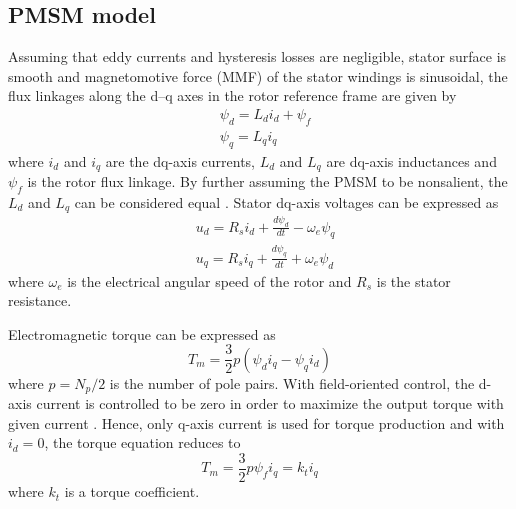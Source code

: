 \subsection{PMSM model} \label{PMSM model}

Assuming that eddy currents and hysteresis losses are negligible, stator surface is smooth and magnetomotive force (MMF) of the stator windings is sinusoidal, the flux linkages along the d–q axes in the rotor reference frame are given by \cite{Vector-control} %
\begin{equation}
    \begin{split}
        & \psi_{d} = L_{d} i_{d} + \psi_f
        \\[2ex]
        & \psi_{q} = L_{q} i_{q}
    \end{split}
    \label{Eq:flux-linkages}
\end{equation}
where $i_d$ and $i_q$ are the dq-axis currents, $L_d$ and $L_q$ are dq-axis inductances and $\psi_f$ is the rotor flux linkage. By further assuming the PMSM to be nonsalient, the $L_d$ and $L_q$ can be considered equal \cite{ILC:2005}. Stator dq-axis voltages can be expressed as \cite{Vector-control}
\begin{equation}
    \begin{split}
        & u_{d} = R_s i_{d} + \frac{d \psi_{d}}{dt} - \omega_e \psi_{q} 
        \\[2ex]
        & u_{q} = R_s i_{q} + \frac{d \psi_{q}}{dt} + \omega_e \psi_{d}
    \end{split}
     \label{Eq:voltage}
\end{equation}
where $\omega_e$ is the electrical angular speed of the rotor and $R_s$ is the stator resistance.

Electromagnetic torque can be expressed as \cite{Vector-control, ILC:2012, ILC:2018}
\begin{equation}
    T_m = \frac{3}{2}p(\psi_{d} i_{q} - \psi_{q} i_{d})
    \label{torque_eq}
\end{equation}
where $p = N_p/2$ is the number of pole pairs. With field-oriented control, the d-axis current is controlled to be zero in order to maximize the output torque with given current \cite{ILC:2012, Vector-control}. Hence, only q-axis current is used for torque production and with $i_{d} = 0$, the torque equation reduces to
\begin{equation}
    T_m = \frac{3}{2}p \psi_f i_{q} = k_t i_{q}
    \label{torque_eq2}
\end{equation}
where $k_t$ is a torque coefficient.


